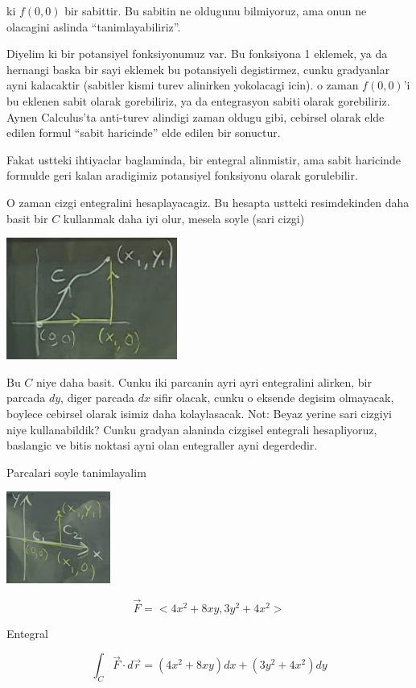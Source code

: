 \documentclass[12pt,fleqn]{article}\usepackage{../common}
\begin{document}
ki $f(0,0)$ bir sabittir. Bu sabitin ne oldugunu bilmiyoruz, ama onun ne
olacagini aslinda ``tanimlayabiliriz''. 

Diyelim ki bir potansiyel fonksiyonumuz var. Bu fonksiyona 1 eklemek, ya da
hernangi baska bir sayi eklemek bu potansiyeli degistirmez, cunku
gradyanlar ayni kalacaktir (sabitler kismi turev alinirken yokolacagi
icin). o zaman $f(0,0)$'i bu eklenen sabit olarak gorebiliriz, ya da
entegrasyon sabiti olarak gorebiliriz. Aynen Calculus'ta anti-turev
alindigi zaman oldugu gibi, cebirsel olarak elde edilen formul ``sabit
haricinde'' elde edilen bir sonuctur. 

Fakat ustteki ihtiyaclar baglaminda, bir entegral alinmistir, ama sabit
haricinde formulde geri kalan aradigimiz potansiyel fonksiyonu olarak
gorulebilir. 

O zaman cizgi entegralini hesaplayacagiz. Bu hesapta ustteki resimdekinden
daha basit bir $C$ kullanmak daha iyi olur, mesela soyle (sari cizgi)

\includegraphics[height=4cm]{21_3.png}

Bu $C$ niye daha basit. Cunku iki parcanin ayri ayri entegralini alirken,
bir parcada $dy$, diger parcada $dx$ sifir olacak, cunku o eksende degisim
olmayacak, boylece cebirsel olarak isimiz daha kolaylasacak. Not: Beyaz
yerine sari cizgiyi niye kullanabildik? Cunku gradyan alaninda cizgisel
entegrali hesapliyoruz, baslangic ve bitis noktasi ayni olan entegraller
ayni degerdedir. 

Parcalari soyle tanimlayalim

\includegraphics[height=3cm]{21_4.png}

\[ \vec{F} = <4x^2 + 8xy, 3y^2 + 4x^2>\]

Entegral

\[ \int_C \vec{F} \cdot d\vec{r} = 
(4x^2 + 8xy) dx + (3y^2 + 4x^2) dy
\]
\end{document}
